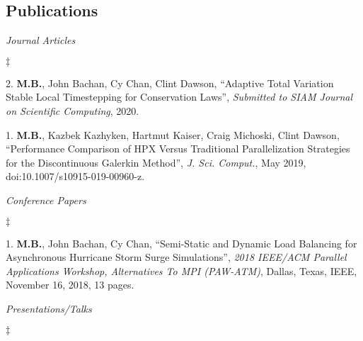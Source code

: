 \documentclass[margin,line]{res}
\newenvironment{list2}{
  \begin{list}{$\ddagger$}{%
      \setlength{\itemsep}{0in}
      \setlength{\parsep}{0in} \setlength{\parskip}{0in}
      \setlength{\topsep}{0in} \setlength{\partopsep}{0in}
      \setlength{\leftmargin}{0.2in}}}{\end{list}}
\newcommand{\article}[5]{%
#1, ``#2'', {\it #3}, #4, #5.%
}
\newcommand{\submitted}[4]{%
#1, ``#2'', {\it Submitted to #3}, #4.%
}
\newcommand{\inproceeding}[7]{%
#1, ``#2'', {\it #3}, #4, #5, #6, #7 pages.%
}
\newcommand{\talk}[4]{%
#1,``#2'', {\it #3}, #4.%
}
\begin{document}
\begin{resume}

\section{\sc Publications}
\textit{Journal Articles}
\vspace{0.05in}
\begin{list2}
\item[2.] \submitted{{\bf M.B.}, John Bachan, Cy Chan, Clint Dawson}{Adaptive Total Variation Stable Local Timestepping for Conservation Laws}{SIAM Journal on Scientific Computing}{2020}
\item[1.] \article{{\bf M.B.}, Kazbek Kazhyken, Hartmut Kaiser, Craig Michoski, Clint Dawson}{Performance Comparison of HPX Versus Traditional Parallelization Strategies for the Discontinuous Galerkin Method}{J. Sci. Comput.}{May 2019}{doi:10.1007/s10915-019-00960-z}
\end{list2}
\clearpage
\textit{Conference Papers}
\vspace{0.05in}
\begin{list2}
\item[1.] \inproceeding{{\bf M.B.}, John Bachan, Cy Chan}{Semi-Static and Dynamic Load Balancing for Asynchronous Hurricane Storm Surge Simulations}{2018 IEEE/ACM Parallel Applications Workshop, Alternatives To MPI (PAW-ATM)}{Dallas, Texas}{IEEE}{November 16, 2018}{13}
\end{list2}


\textit{Presentations/Talks}
\vspace{0.05in}
\begin{list2}


\end{list2}
\end{resume}
\end{document}
